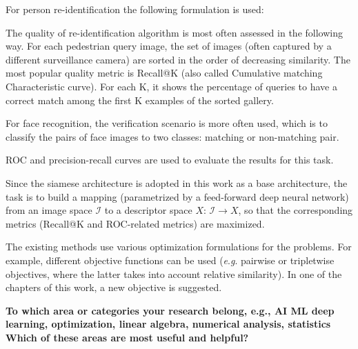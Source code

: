 \documentclass[a4paper, 11pt, oneside]{Thesis}  %
\makeatletter
\newcommand{\eg}{\textit{e}.\textit{g}.}
\newcommand{\problemtitle}[1]{\gdef\@problemtitle{#1}}%
\newcommand{\probleminput}[1]{\gdef\@probleminput{#1}}%
\newcommand{\problemquestion}[1]{\gdef\@problemquestion{#1}}%
\makeatother
\begin{document}
For person re-identification the following formulation is  used:
\begin{problem}
\label{pr:identification}
  \problemtitle{Re-identification}
  \probleminput{Query image $q$, gallery images $G=\{g_i\}_{i=1}^{n_G}$}
  \problemquestion{Find such an image $g_j \in G$ from the gallery that $g_j$ depicts the same identity as $q$: $l_q = l_{g_j}$}
\end{problem}

The quality of re-identification algorithm is most often assessed in the following way. For each pedestrian query image, the set of images (often captured by a different surveillance camera) are sorted in the order of decreasing similarity. The most popular quality metric is Recall@K (also called Cumulative matching Characteristic curve). For each K, it shows  the percentage of queries to have a correct match among the first K examples of the sorted gallery. 


For face recognition, the verification scenario is more often used, which is to classify the pairs of face images to two classes: matching or non-matching pair. 

\begin{problem}
\label{pr:verification}
  \problemtitle{Verification}
  \probleminput{A pair of images $(q_1, q_2)$}
  \problemquestion{Determine whether the images $q_1$ and $q_2$ depict the same person or two different persons: 
                   $l_{q_1} ?= l_{q_2}$}
\end{problem}


ROC and precision-recall curves are used to evaluate the results for this task.

Since the siamese architecture is adopted in this work as a base architecture, the task is to build a mapping (parametrized by a feed-forward deep neural network) from an image space $\mathcal I$ to a descriptor space $X$: $\mathcal I \rightarrow X$, so that the corresponding metrics (Recall@K and ROC-related metrics) are maximized. 

The existing methods use various optimization formulations for the problems. For example, different objective functions can be used (\eg{} pairwise or tripletwise objectives, where the latter takes into account relative similarity). In one of the chapters of this work, a new objective is suggested.


\bigskip\ident\textbf{
To which area or categories your research belong,
e.g., AI ML deep learning, optimization,
linear algebra, numerical analysis, statistics Which of these areas are most useful and helpful?}
\end{document}
